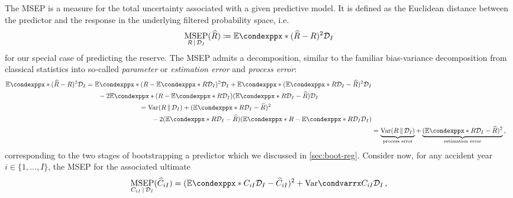 \documentclass[a4paper]{book}
\begin{document}
The MSEP is a measure for the total uncertainty associated with a given predictive model. It is defined as the Euclidean distance between the predictor and the response in the underlying filtered probability space, i.e.\
\begin{equation}
  \underset{R \, \vert \, \mathcal{D}_I}{\mathrm{MSEP}}(\widehat{R}) \coloneqq \condexpp*{(\widehat{R} - R)^2}{\mathcal{D}_I}
\end{equation}
for our special case of predicting the reserve. The MSEP admits a decomposition, similar to the familiar bias-variance decomposition from classical statistics into so-called \emph{parameter} or \emph{estimation error} and \emph{process error}:
\begin{align}
  \begin{split}
    \condexpp*{(\widehat{R} - R)^2}{\mathcal{D}_I} &= \condexpp*{(R - \condexpp*{R}{\mathcal{D}_I})^2}{\mathcal{D}_I} + \condexpp*{(\condexpp*{R}{\mathcal{D}_I} - \widehat{R})^2}{\mathcal{D}_I} \\ &\phantom{{}=1} -2\condexpp*{(R - \condexpp*{R}{\mathcal{D}_I})(\condexpp*{R}{\mathcal{D}_I} - \widehat{R})}{\mathcal{D}_I}
  \end{split} \\
  \begin{split}
    &= \mathrm{Var}(R \, \Vert \, \mathcal{D}_I) + (\condexpp*{R}{\mathcal{D}_I} - \widehat{R})^2 \\
    &\phantom{{}=1} -2(\condexpp*{R}{\mathcal{D}_I} - \widehat{R})(\condexpp*{R - \condexpp*{R}{\mathcal{D}_I}}{\mathcal{D}_I})
  \end{split}                                                                                                                                                                                                                                               \\
   & = \underbrace{\mathrm{Var}(R \, \Vert \, \mathcal{D}_I)}_\text{process error} + \underbrace{(\condexpp*{R}{\mathcal{D}_I} - \widehat{R})^2}_\text{estimation error} \,,
\end{align}
corresponding to the two stages of bootstrapping a predictor which we discussed in \cref{sec:boot-reg}. Consider now, for any accident year $i \in \{ 1, \dots, I \}$, the MSEP for the associated ultimate
\begin{equation} \label{eq:msep}
  \underset{C_{iI} \, \vert \, \mathcal{D}_I}{\mathrm{MSEP}}(\widehat{C}_{iI}) = (\condexpp*{C_{iI}}{\mathcal{D}_I} - \widehat{C}_{iI})^2 + \condvarr{C_{iI}}{\mathcal{D}_I} \,,
\end{equation}
\end{document}
